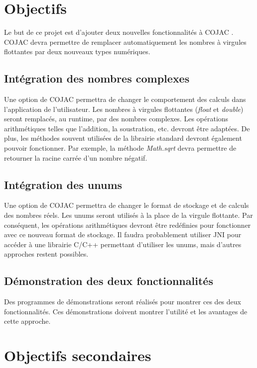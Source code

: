 \section{Objectifs}

Le but de ce projet est d'ajouter deux nouvelles fonctionnalités à COJAC \cite{COJAC}. COJAC devra permettre de remplacer automatiquement les nombres à virgules flottantes par deux nouveaux types numériques.

\subsection{Intégration des nombres complexes}

Une option de COJAC permettra de changer le comportement des calculs dans l'application de l'utilisateur. Les nombres à virgules flottantes (\textit{float} et \textit{double}) seront remplacés, au runtime, par des nombres complexes. Les opérations arithmétiques telles que l'addition, la soustration, etc. devront être adaptées. De plus, les méthodes souvent utilisées de la librairie standard devront également pouvoir fonctionner. Par exemple, la méthode \textit{Math.sqrt} devra permettre de retourner la racine carrée d'un nombre négatif.

\subsection{Intégration des unums}

Une option de COJAC permettra de changer le format de stockage et de calculs des nombres réels. Les unums seront utilisés à la place de la virgule flottante. Par conséquent, les opérations arithmétiques devront être redéfinies pour fonctionner avec ce nouveau format de stockage. Il faudra probablement utiliser JNI pour accéder à une librairie C/C++ permettant d'utiliser les unums, mais d'autres approches restent possibles.

\subsection{Démonstration des deux fonctionnalités}

Des programmes de démonstrations seront réalisés pour montrer ces des deux fonctionnalités. Ces démonstrations doivent montrer l'utilité et les avantages de cette approche.

\section{Objectifs secondaires}

